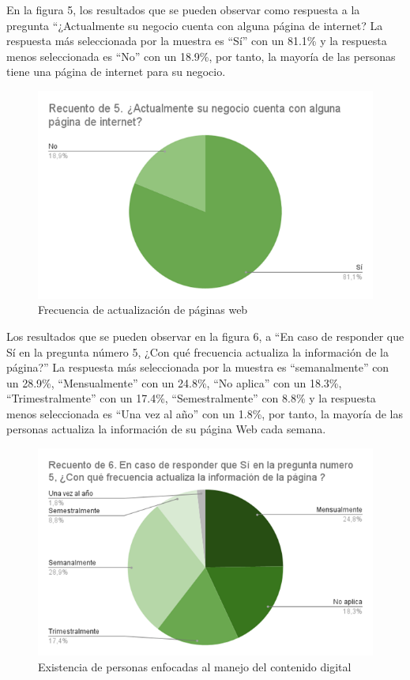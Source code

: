 \documentclass[12pt]{difu100cia} %
\begin{document}
	
En la figura 5, los resultados que se pueden observar como respuesta a la pregunta “¿Actualmente su negocio cuenta con alguna página de internet? La respuesta más seleccionada por la muestra es “Sí” con un 81.1\% y la respuesta menos seleccionada es “No” con un 18.9\%, por tanto, la mayoría de las personas tiene una página de internet para su negocio.


\begin{figure}[!htb]
	\centering
	\includegraphics[width=\linewidth]{Figura 6.png}
	\caption{Frecuencia de actualización de páginas web}
	\label{Figur 6}
\end{figure}
	
	
Los resultados que se pueden observar en la figura 6, a “En caso de responder que Sí en la pregunta número 5, ¿Con qué frecuencia actualiza la información de la página?” La respuesta más seleccionada por la muestra es “semanalmente” con un 28.9\%, “Mensualmente” con un 24.8\%, “No aplica” con un 18.3\%, “Trimestralmente” con un 17.4\%, “Semestralmente” con 8.8\%   y la respuesta menos seleccionada es “Una vez al año” con un 1.8\%, por tanto, la mayoría de las personas actualiza la información de su página Web cada semana.


\begin{figure}[!htb]
	\centering
	\includegraphics[width=\linewidth]{Figura 7.png}
	\caption{Existencia de personas enfocadas al manejo del contenido digital}
	\label{Figur 7}
\end{figure}
	
\end{document}
